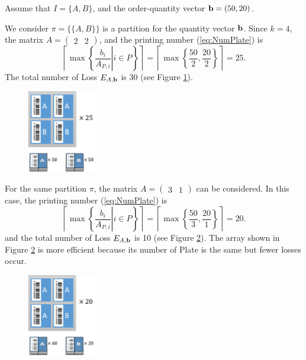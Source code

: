 \begin{example}
	Assume that $I=\{A,B\}$, and the order-quantity vector ${\bf b}=(50,20)$.
	
	We consider $\pi = \{\{A,B\}\}$ is a partition for the quantity vector ${\bf b}$. Since $k = 4$, 
	the matrix $A = (\begin{array}{cc}2 & 2\end{array})$, and the printing number (\ref{eq:NumPlate}) is 
	\begin{equation}
	\left\lceil \max\left\{ \left. \frac{b_{i}}{A_{P,i}} \right| i \in P \right\} \right\rceil = \left\lceil \max \left\{ \frac{50}{2}, \frac{20}{2} \right\} \right\rceil = 25.
	\end{equation}
	The total number of Loss $E_{A,{\bf b}}$ is 30 (see Figure \ref{fig:ex21}).
	
	\begin{figure}[h!]
		\centering
		\includegraphics[width=3cm]{ex21.pdf}
		\caption{}
		\label{fig:ex21}       %
	\end{figure}
	
	For the same partition $\pi$, the matrix $A = (\begin{array}{cc}3 & 1\end{array})$ can be considered. In this case, the printing number (\ref{eq:NumPlate}) is 
	\begin{equation}
	\left\lceil \max\left\{ \left. \frac{b_{i}}{A_{P,i}} \right| i \in P \right\} \right\rceil = \left\lceil \max \left\{ \frac{50}{3}, \frac{20}{1} \right\} \right\rceil = 20.
	\end{equation}
	and the total number of Loss $E_{A,{\bf b}}$ is 10 (see Figure \ref{fig:ex22}).
	The array shown in Figure \ref{fig:ex22} is more efficient because its number of Plate is the same but fewer losses occur.
	\begin{figure}[h!]
		\centering
		\includegraphics[width=3cm]{ex22.pdf}
		\caption{}
		\label{fig:ex22}       %
	\end{figure}
\end{example}


